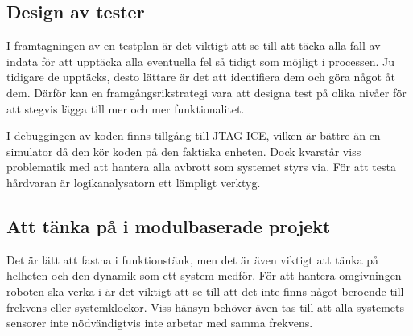 \documentclass[11pt]{article}
\begin{document}
\begin{flushleft}
\subsection{Design av tester}
I framtagningen av en testplan är det viktigt att se till att täcka alla fall av indata för att upptäcka alla eventuella fel så tidigt som möjligt i processen. Ju tidigare de upptäcks, desto lättare är det att identifiera dem och göra något åt dem. Därför kan en framgångsrikstrategi vara att designa test på olika nivåer för att stegvis lägga till mer och mer funktionalitet.

I debuggingen av koden finns tillgång till JTAG ICE, vilken är bättre än en simulator då den kör koden på den faktiska enheten. Dock kvarstår viss problematik med att hantera alla avbrott som systemet styrs via. För att testa hårdvaran är logikanalysatorn ett lämpligt verktyg.

\subsection{Att tänka på i modulbaserade projekt}
Det är lätt att fastna i funktionstänk, men det är även viktigt att tänka på helheten och den dynamik som ett system medför. För att hantera omgivningen roboten ska verka i är det viktigt att se till att det inte finns något beroende till frekvens eller systemklockor. Viss hänsyn behöver även tas till att alla systemets sensorer inte nödvändigtvis inte arbetar med samma frekvens.

\pagebreak
{}




\end{flushleft}
\end{document}
